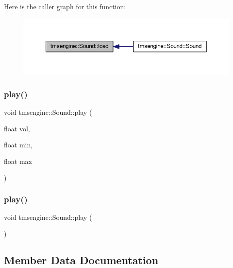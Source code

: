 Here is the caller graph for this function\+:\nopagebreak
\begin{figure}[H]
\begin{center}
\leavevmode
\includegraphics[width=350pt]{classtmsengine_1_1_sound_aca383fe0b166a15eae25580e1e1e8d41_icgraph}
\end{center}
\end{figure}
\mbox{\label{classtmsengine_1_1_sound_aeb5717b4ce5f64b7c1e696f471730486}} 
\subsubsection{\texorpdfstring{play()}{play()}\hspace{0.1cm}{\footnotesize\ttfamily [1/2]}}
{\footnotesize\ttfamily void tmsengine\+::\+Sound\+::play (\begin{DoxyParamCaption}\item[{float}]{vol,  }\item[{float}]{min,  }\item[{float}]{max }\end{DoxyParamCaption})}

\mbox{\label{classtmsengine_1_1_sound_a842d33a838588ed6a4652b427faa5e0a}} 
\subsubsection{\texorpdfstring{play()}{play()}\hspace{0.1cm}{\footnotesize\ttfamily [2/2]}}
{\footnotesize\ttfamily void tmsengine\+::\+Sound\+::play (\begin{DoxyParamCaption}{ }\end{DoxyParamCaption})}



\subsection{Member Data Documentation}
\mbox{\label{classtmsengine_1_1_sound_ac6c9ad2ebd7410f0cdc0d58a3891a5b8}} 
